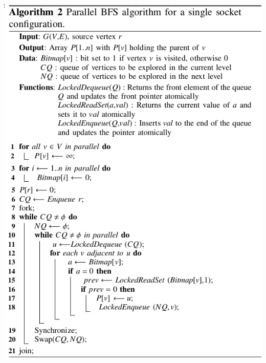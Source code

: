 \documentclass[]{beamer}
\begin{document}
\begin{frame}
\begin{columns}
\begin{column}{.5\textwidth}
      \includegraphics[width=\textwidth]{figures/sc10-algo2}
    \end{column}
  \end{columns}
\end{frame}
\end{document}
